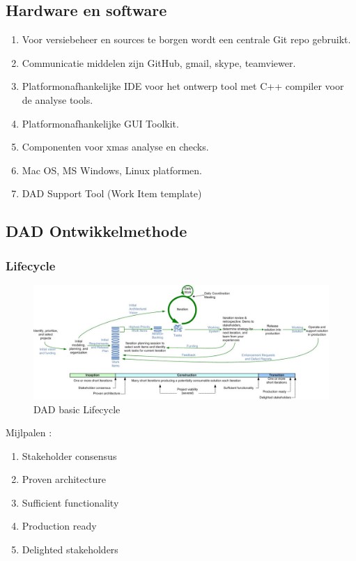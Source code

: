 \subsection{Hardware en software}
\begin{enumerate}
	\item Voor versiebeheer en sources te borgen wordt een centrale Git repo gebruikt.
	\item Communicatie middelen zijn GitHub, gmail, skype,  teamviewer.
	\item Platformonafhankelijke IDE voor het ontwerp tool met C++ compiler voor de analyse tools.
	\item Platformonafhankelijke GUI Toolkit.
	\item Componenten voor xmas analyse en checks.
	\item Mac OS,  MS Windows, Linux platformen.
	\item DAD Support Tool (Work Item template)
\end{enumerate}


\subsection{DAD Ontwikkelmethode}
\subsubsection{Lifecycle}

\begin{figure}[h]
  \includegraphics[width=1.0\textwidth]{dadLifecycleUP2}
  \caption{DAD basic Lifecycle}
\end{figure}
Mijlpalen :
\begin{enumerate}
\item Stakeholder consensus
\item Proven architecture
\item Sufficient functionality
\item Production ready
\item Delighted stakeholders
\end{enumerate}

